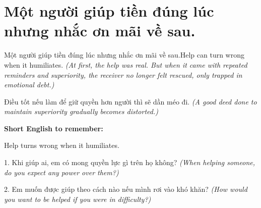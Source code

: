 \section{Một người giúp tiền đúng lúc nhưng nhắc ơn mãi về sau.}
\begin{truyen}{Một người giúp tiền đúng lúc nhưng nhắc ơn mãi về sau.}{Help can turn wrong when it humiliates.}
\textit{(At first, the help was real. But when it came with repeated reminders and superiority, the receiver no longer felt rescued, only trapped in emotional debt.)}
\end{truyen}
\begin{baihoc}
Điều tốt nếu làm để giữ quyền hơn người thì sẽ dần méo đi.
\textit{(A good deed done to maintain superiority gradually becomes distorted.)}
\end{baihoc}
\begin{ghinhoanh}\textbf{Short English to remember:}

Help turns wrong when it humiliates.
\end{ghinhoanh}
\begin{tuhocnhanh}
1. Khi giúp ai, em có mong quyền lực gì trên họ không? \textit{(When helping someone, do you expect any power over them?)}

2. Em muốn được giúp theo cách nào nếu mình rơi vào khó khăn? \textit{(How would you want to be helped if you were in difficulty?)}
\end{tuhocnhanh}
\ngancach


